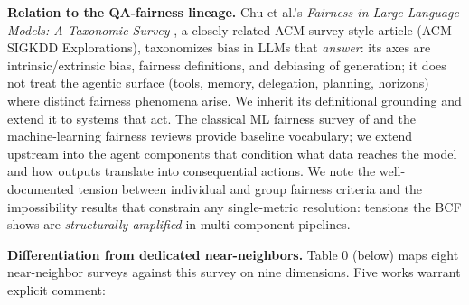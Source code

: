 \documentclass[10pt]{article}
\begin{document}
\textbf{Relation to the QA-fairness lineage.} Chu et al.'s \emph{Fairness in Large Language Models: A Taxonomic Survey} \cite{chu2024fairness}, a closely related ACM survey-style article (ACM SIGKDD Explorations), taxonomizes bias in LLMs that \emph{answer}: its axes are intrinsic/extrinsic bias, fairness definitions, and debiasing of generation; it does not treat the agentic surface (tools, memory, delegation, planning, horizons) where distinct fairness phenomena arise. We inherit its definitional grounding \cite{dwork2012fairness,hardt2016equality,kusner2017counterfactual,gallegos2024bias} and extend it to systems that act. The classical ML fairness survey of \cite{mehrabi2021survey} and the machine-learning fairness reviews \cite{pessach2022review,caton2024fairness} provide baseline vocabulary; we extend upstream into the agent components that condition what data reaches the model and how outputs translate into consequential actions. We note the well-documented tension between individual and group fairness criteria \cite{dwork2012fairness} and the impossibility results \cite{kleinberg2017inherent,chouldechova2017fair} that constrain any single-metric resolution: tensions the BCF shows are \emph{structurally amplified} in multi-component pipelines.

\textbf{Differentiation from dedicated near-neighbors.} Table 0 (below) maps eight near-neighbor surveys against this survey on nine dimensions. Five works warrant explicit comment:
\end{document}
